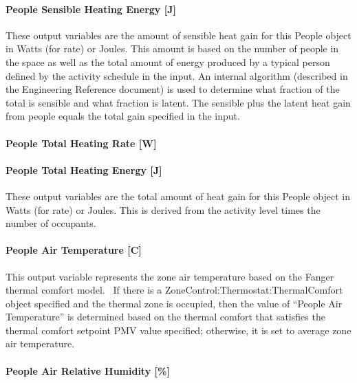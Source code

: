 \paragraph{People Sensible Heating Energy {[}J{]}}\label{people-sensible-heating-energy-j}

These output variables are the amount of sensible heat gain for this People object in Watts (for rate) or Joules. This amount is based on the number of people in the space as well as the total amount of energy produced by a typical person defined by the activity schedule in the input. An internal algorithm (described in the Engineering Reference document) is used to determine what fraction of the total is sensible and what fraction is latent. The sensible plus the latent heat gain from people equals the total gain specified in the input.

\paragraph{People Total Heating Rate {[}W{]}}\label{people-total-heating-rate-w}

\paragraph{People Total Heating Energy {[}J{]}}\label{people-total-heating-energy-j}

These output variables are the total amount of heat gain for this People object in Watts (for rate) or Joules. This is derived from the activity level times the number of occupants.

\paragraph{People Air Temperature {[}C{]}}\label{people-air-temperature-c}

This output variable represents the zone air temperature based on the Fanger thermal comfort model.~ If there is a ZoneControl:Thermostat:ThermalComfort object specified and the thermal zone is occupied, then the value of ``People Air Temperature'' is determined based on the thermal comfort that satisfies the thermal comfort setpoint PMV value specified; otherwise, it is set to average zone air temperature.

\paragraph{People Air Relative Humidity {[}\%{]}}\label{people-air-relative-humidity}

